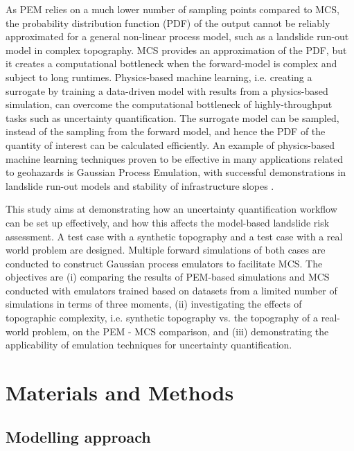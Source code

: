 \documentclass[utf8]{FrontiersinHarvard}
\begin{document}
As PEM relies on a much lower number of sampling points compared to MCS, the probability distribution function (PDF) of the output cannot be reliably approximated for a general non-linear process model, such as a landslide run-out model in complex topography. MCS provides an approximation of the PDF, but it creates a computational bottleneck when the forward-model is complex and subject to long runtimes. Physics-based machine learning, i.e. creating a surrogate by training a data-driven model with results from a physics-based simulation, can overcome the computational bottleneck of  highly-throughput tasks such as uncertainty quantification. The surrogate model can be sampled, instead of the sampling from the forward model, and hence the PDF of the quantity of interest can be calculated efficiently. An example of physics-based machine learning techniques proven to be effective in many applications related to geohazards is Gaussian Process Emulation, with successful demonstrations in landslide run-out models \citep{Zhao2021, Zhao2022} and stability of infrastructure slopes \citep{Svalova2021}.

This study aims at demonstrating how an uncertainty quantification workflow can be set up effectively, and how this affects the model-based landslide risk assessment. A test case with a synthetic topography and a test case with a real world problem are designed. Multiple forward simulations of both cases are conducted to construct Gaussian process emulators to facilitate MCS. The objectives are (i) comparing the results of PEM-based  simulations and MCS conducted with emulators trained based on datasets from a limited number of simulations in terms of three moments, (ii) investigating the effects of topographic complexity, i.e. synthetic topography vs. the topography of a real-world problem, on the PEM - MCS comparison, and (iii) demonstrating the applicability of emulation techniques for uncertainty quantification.

\section{Materials and Methods}

\subsection{Modelling approach}
\end{document}

